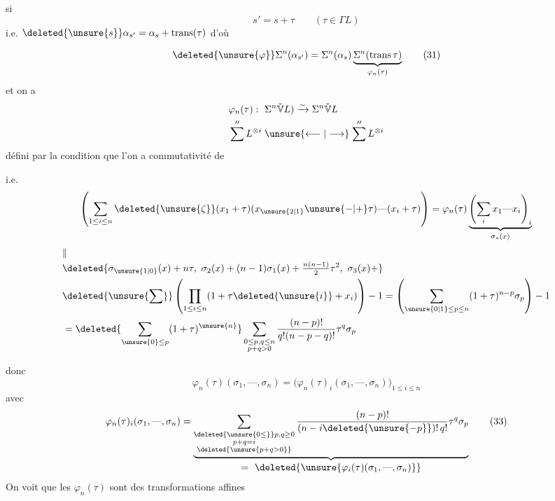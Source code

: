 si
\[
s'=s+\tau\qquad(\tau\in\Gamma L)
\]
i.e. \qquad $\deleted{\unsure{s}}\alpha_{s'}=\alpha_s+\operatorname{trans}(\tau)$ \qquad d'où


\[
\deleted{\unsure{\varphi}}\Sigma^n(\alpha_{s'})=\Sigma^n(\alpha_s)\underbrace{\Sigma^n(\operatorname{trans}\tau)}_{\varphi_n(\tau)} \tag*{(31)}
\]
et  on a
\[
\begin{aligned}
&\varphi_n(\tau):\ \Sigma^n\check{\mathbb V}L)\xrightarrow{\sim}\Sigma^n\check{\mathbb V}L\\
&\sum^{\prime\prime} L^{\otimes i}\mathrel{\unsure{\longleftarrow|\longrightarrow}}\sum^{\prime\prime}L^{\otimes i}
\end{aligned}
\]
défini par la condition que l'on a commutativité de


i.e.
\[
\left(\sum_{1\le i\le n}\deleted{\unsure{\zeta}}(x_1+\tau)(x_{\unsure{2|1}}\unsure{-|+}\tau)\text{---}(x_i+\tau)\right)
=\varphi_n(\tau)\underbrace{\left(\sum_i x_1\text{---}x_i\right)_i}_{\sigma_*(x)}
\]
\[
\begin{aligned}
&\Vert\\[-2pt]
&\deleted{\sigma_{\unsure{1|0}}(x)+n\tau,\ \sigma_2(x)+(n-1)\sigma_1(x)+\tfrac{n(n-1)}2\tau^2,\ \sigma_3(x)+}\\
&\deleted{\unsure{\sum}}\left(\prod_{1\le i\le n}(1+\tau\deleted{\unsure{i}}+x_i)\right)-1
=\left(\sum_{\unsure{0|1}\le p\le n}(1+\tau)^{n-p}\sigma_p\right)-1\\
&=\deleted{\sum_{\unsure{0}\le p}(1+\tau)^{\unsure{n}}}
\sum_{\substack{0\le p,q\le n\\p+q>0}}\frac{(n-p)!}{q!(n-p-q)!}\tau^q\sigma_p
\end{aligned}
\]

donc
\[
\varphi_n(\tau)(\sigma_1,\text{---},\sigma_n)=
 \bigl(\varphi_n(\tau)_i(\sigma_1,\text{---},\sigma_n)\bigr)_{1\le i\le n} \tag*{(32)}
\]
avec
\[
\varphi_n(\tau)_i(\sigma_1,\text{---},\sigma_n)=
\underbrace{\sum_{\substack{\deleted{\unsure{0\le}}p,q\ge0\\p+q=i\\\deleted{\unsure{p+q>0}}}}
\frac{(n-p)!}{(n-i\deleted{\unsure{-p}})!\,q!}\tau^q\sigma_p}_{\displaystyle =\ \deleted{\unsure{\varphi_i(\tau)(\sigma_1,\text{---},\sigma_n)}}}
\tag*{(33)}
\]
On voit que les $\varphi_n(\tau)$ sont des transformations affines

